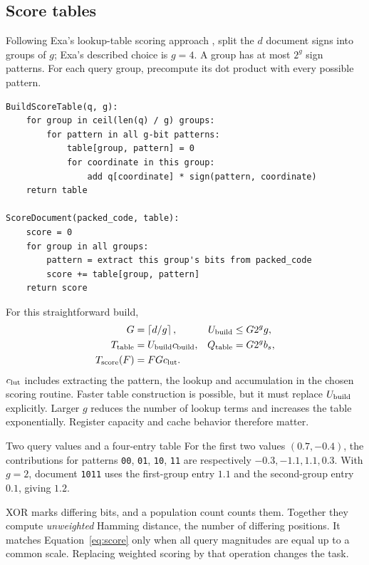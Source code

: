\subsection{Score tables}
Following Exa's lookup-table scoring approach \cite{exa}, split the $d$ document signs into
groups of $g$; Exa's described choice is $g=4$. A group has at most $2^g$ sign patterns.
For each query group, precompute its dot product with every possible pattern.
\par\noindent\begin{minipage}{\linewidth}
\begin{lstlisting}[caption={The score table. Padding contributes zero in the last group.}]
BuildScoreTable(q, g):
    for group in ceil(len(q) / g) groups:
        for pattern in all g-bit patterns:
            table[group, pattern] = 0
            for coordinate in this group:
                add q[coordinate] * sign(pattern, coordinate)
    return table

ScoreDocument(packed_code, table):
    score = 0
    for group in all groups:
        pattern = extract this group's bits from packed_code
        score += table[group, pattern]
    return score
\end{lstlisting}
\end{minipage}\par
For this straightforward build,
\begin{align}
G&=\left\lceil d/g\right\rceil, & U_{\rm build}&\leq G2^g g,\\
T_{\rm table}&=U_{\rm build}c_{\rm build}, & Q_{\rm table}&=G2^g b_s,\\
T_{\rm score}(F)&=F G c_{\rm lut}.&&
\label{eq:lut}
\end{align}
$c_{\rm lut}$ includes extracting the pattern, the lookup and accumulation in the chosen
scoring routine. Faster table construction is possible, but it must replace $U_{\rm build}$ explicitly.
Larger $g$ reduces the number of lookup terms and increases the table exponentially. Register
capacity and cache behavior therefore matter.

\begin{examplebox}{Two query values and a four-entry table}
For the first two values $(0.7,-0.4)$, the contributions for patterns
\texttt{00}, \texttt{01}, \texttt{10}, \texttt{11} are respectively
$-0.3,-1.1,1.1,0.3$. With $g=2$, document \texttt{1011} uses the first-group entry
$1.1$ and the second-group entry $0.1$, giving $1.2$.
\end{examplebox}

XOR marks differing bits, and a population count counts them. Together they compute
\emph{unweighted} Hamming distance, the number of differing positions. It
matches Equation~\eqref{eq:score} only when all query magnitudes are equal up to a common
scale. Replacing weighted scoring by that operation changes the task.

